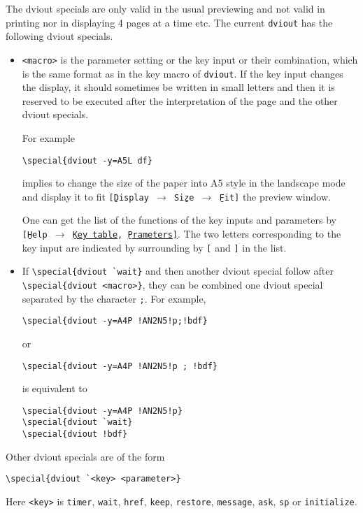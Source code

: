 \documentclass{article}
\begin{document}
The dviout specials are only valid in the usual previewing and not valid in 
printing nor in displaying 4 pages at a time etc.
The current {\tt dviout} has the following dviout specials. 
\begin{itemize}
\item
{\tt <macro>} is the parameter setting or the key input or their combination,
which is the same format as in the key macro of {\tt dviout}.  
If the key input changes the display, it should sometimes be written in
small letters and then it is reserved to be executed after the interpretation 
of the page and the other dviout specials.

For example
\begin{verbatim}
\special{dviout -y=A5L df}
\end{verbatim}
implies to change the size of the paper into A5 style in the landscape mode 
and display it to fit {\tt[\b{D}isplay $\to$ Si\b{z}e $\to$ \b{F}it]}
the preview window. 

One can get the list of the functions of the key inputs and parameters by 
{\tt[\b{H}elp $\to$ 
\href{dviout:HK}{\b{K}ey table}, \href{dviout:HP}{\b{P}rameters]}}.  
The two letters corresponding to the key input are indicated by surrounding by 
{\tt[} and {\tt]} in the list.

\item If \verb|\special{dviout `wait}| and then another dviout special
follow after \verb|\special{dviout <macro>}|, they can be 
combined one dviout special separated by the character {\tt ;}.
For example,
\begin{verbatim}
\special{dviout -y=A4P !AN2N5!p;!bdf}
\end{verbatim}
or
\begin{verbatim}
\special{dviout -y=A4P !AN2N5!p ; !bdf}
\end{verbatim}
is equivalent to
\begin{verbatim}
\special{dviout -y=A4P !AN2N5!p}
\special{dviout `wait}
\special{dviout !bdf}
\end{verbatim}
\end{itemize}

Other dviout specials are of the form
\begin{verbatim}
\special{dviout `<key> <parameter>}
\end{verbatim}
Here \verb|<key>| is {\tt timer}, {\tt wait}, {\tt href}, {\tt keep}, 
{\tt restore}, {\tt message}, {\tt ask}, {\tt sp} or {\tt initialize}.
\end{document}
